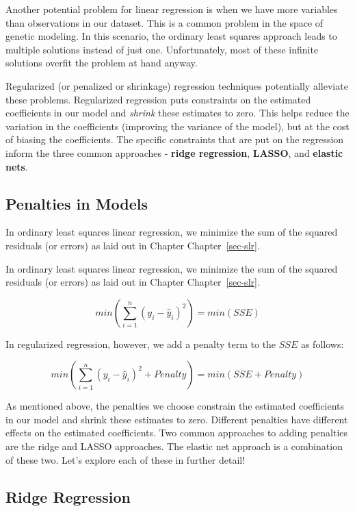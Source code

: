 \documentclass[
  letterpaper,
  DIV=11,
  numbers=noendperiod]{scrreprt}
\begin{document}
Another potential problem for linear regression is when we have more
variables than observations in our dataset. This is a common problem in
the space of genetic modeling. In this scenario, the ordinary least
squares approach leads to multiple solutions instead of just one.
Unfortunately, most of these infinite solutions overfit the problem at
hand anyway.

Regularized (or penalized or shrinkage) regression techniques
potentially alleviate these problems. Regularized regression puts
constraints on the estimated coefficients in our model and \emph{shrink}
these estimates to zero. This helps reduce the variation in the
coefficients (improving the variance of the model), but at the cost of
biasing the coefficients. The specific constraints that are put on the
regression inform the three common approaches - \textbf{ridge
regression}, \textbf{LASSO}, and \textbf{elastic nets}.

\hypertarget{penalties-in-models}{%
\subsection{Penalties in Models}\label{penalties-in-models}}

In ordinary least squares linear regression, we minimize the sum of the
squared residuals (or errors) as laid out in Chapter
Chapter~\ref{sec-slr}.

In ordinary least squares linear regression, we minimize the sum of the
squared residuals (or errors) as laid out in Chapter
Chapter~\ref{sec-slr}.

\[
min(\sum_{i=1}^n(y_i - \hat{y}_i)^2) = min(SSE)
\]

In regularized regression, however, we add a penalty term to the \(SSE\)
as follows:

\[
min(\sum_{i=1}^n(y_i - \hat{y}_i)^2 + Penalty) = min(SSE + Penalty)
\]

As mentioned above, the penalties we choose constrain the estimated
coefficients in our model and shrink these estimates to zero. Different
penalties have different effects on the estimated coefficients. Two
common approaches to adding penalties are the ridge and LASSO
approaches. The elastic net approach is a combination of these two.
Let's explore each of these in further detail!

\hypertarget{ridge-regression}{%
\subsection{Ridge Regression}\label{ridge-regression}}
\end{document}
